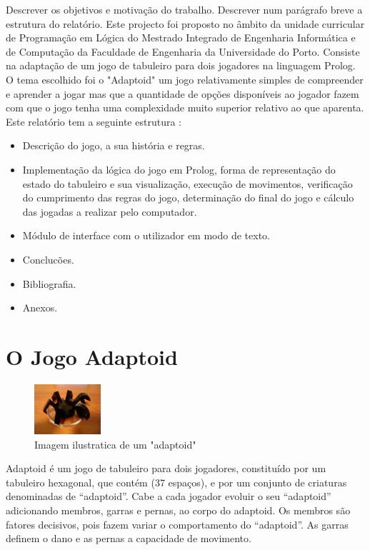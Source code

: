 \documentclass[a4paper]{article}
\begin{document}
Descrever os objetivos e motivação do trabalho. Descrever num parágrafo breve a estrutura do relatório.
Este projecto foi proposto no âmbito da unidade curricular de Programação em Lógica do Mestrado Integrado de Engenharia Informática e de Computação da Faculdade de Engenharia da Universidade do Porto. Consiste na adaptação de um jogo de tabuleiro para dois jogadores na linguagem Prolog. O tema escolhido foi o "Adaptoid" um jogo relativamente simples de compreender e aprender a jogar mas que a quantidade de opções disponíveis ao jogador fazem com que o jogo tenha uma complexidade muito superior relativo ao que aparenta.
Este relatório tem a seguinte estrutura :
 \begin{itemize}
   \item Descrição do jogo, a sua história e regras.
   \item Implementação da lógica do jogo em Prolog, forma de representação do estado do tabuleiro e sua visualização, execução de movimentos, verificação do cumprimento das regras do jogo, determinação do final do jogo e cálculo das jogadas a realizar pelo computador.
   \item Módulo de interface com o utilizador em modo de texto.
   \item Conclucões.
   \item Bibliografia.
   \item Anexos.
 \end{itemize}



\section{O Jogo Adaptoid}

\begin{figure} 
    \centering
    \includegraphics[width=0.22\textwidth]{adaptoid}
    \caption{Imagem ilustratica de um "adaptoid"}
\end{figure}


Adaptoid é um jogo de tabuleiro para dois jogadores, constituído por um tabuleiro hexagonal, que contém (37 espaços), e por um conjunto de criaturas denominadas de “adaptoid”. Cabe a cada jogador evoluir o seu “adaptoid” adicionando membros, garras e pernas, ao corpo do adaptoid. Os membros são fatores decisivos, pois fazem variar o comportamento do “adaptoid”. As garras definem o dano e as pernas a capacidade de movimento. 
\end{document}
